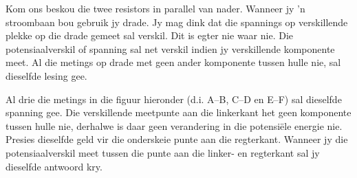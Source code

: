 Kom ons beskou die twee resistors in parallel van nader. Wanneer jy 'n
stroombaan bou gebruik jy drade. Jy mag dink dat die spannings op verskillende
plekke op die drade gemeet sal verskil. Dit is egter nie waar nie. Die
potensiaalverskil of spanning sal net verskil indien jy verskillende komponente
meet. Al die metings op drade met geen ander komponente tussen hulle nie, sal
dieselfde lesing gee.

Al drie die metings in die figuur hieronder (d.i. A--B, C--D en E--F) sal
dieselfde spanning gee. Die verskillende meetpunte aan die linkerkant het geen
komponente tussen hulle nie, derhalwe is daar geen verandering in die
potensi\"ele energie nie. Presies dieselfde geld vir die onderskeie punte aan
die regterkant. Wanneer jy die potensiaalverskil meet tussen die punte aan die
linker- en regterkant sal jy dieselfde antwoord kry.

